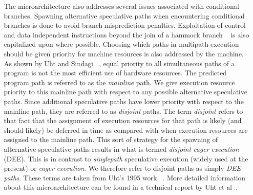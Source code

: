 \documentclass[10pt,dvips]{article}
\begin{document}
The microarchitecture also 
addresses several issues associated with conditional branches.
Spawning alternative speculative paths when encountering conditional
branches is done to avoid branch misprediction penalties.
Exploitation of control
and data independent instructions beyond the join of a 
hammock branch ~\cite{Fer87}
is also capitalized upon where possible.
Choosing which paths in multipath execution should
be given priority for machine resources is also addressed
by the machine.
As shown by Uht and Sindagi ~\cite{Uht95},
equal priority to all simultaneous paths
of a program is not the most efficient use of hardware resources.
The predicted program path is referred to as the \textit{mainline} path.  
We give execution resource priority to this mainline path with respect
to any possible alternative speculative paths.  
Since additional speculative paths have lower priority with
respect to the mainline path, they are referred
to as \textit{disjoint} paths.  
The term \textit{disjoint} refers to that fact that the assignment
of execution resources for that path is likely (and should likely) be
deferred in time
as compared with when execution resources are assigned to the mainline
path.  This sort of strategy for the spawning of alternative speculative
paths results in what is termed \textit{disjoint eager execution} (DEE).
This is in contrast to \textit{singlepath} speculative execution
(widely used at the present)
or \textit{eager execution}.
We therefore refer to disjoint paths as simply \textit{DEE paths}.
These terms are taken from Uht's 1995 work ~\cite{Uht95}.
More detailed information about this microarchitecture
can be found in a technical report by Uht et al~\cite{Uht01}.
%
%
\end{document}
